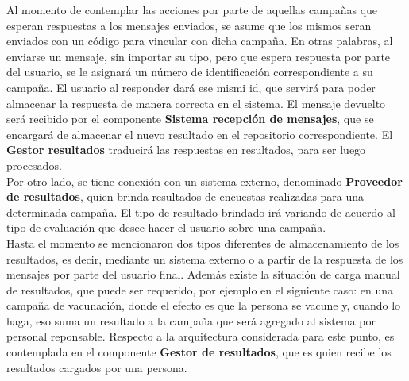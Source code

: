 \documentclass[a4paper, 11pt]{article}
\begin{document}
Al momento de contemplar las acciones por parte de aquellas campañas que esperan respuestas a los mensajes enviados, se asume que los mismos seran enviados con un código para vincular con dicha campaña. En otras palabras, al enviarse un mensaje, sin importar su tipo, pero que espera respuesta por parte del usuario, se le asignará un número de identificación correspondiente a su campaña. El usuario al responder dará ese mismi id, que servirá para poder almacenar la respuesta de manera correcta en el sistema. El mensaje devuelto será recibido por el componente \textbf{Sistema recepción de mensajes}, que se encargará de almacenar el nuevo resultado en el repositorio correspondiente. El \textbf{Gestor resultados} traducirá las respuestas en resultados, para ser luego procesados. \\

Por otro lado, se tiene conexión con un sistema externo, denominado \textbf{Proveedor de resultados}, quien brinda resultados de encuestas realizadas para una determinada campaña. El tipo de resultado brindado irá variando de acuerdo al tipo de evaluación que desee hacer el usuario sobre una campaña. \\

Hasta el momento se mencionaron dos tipos diferentes de almacenamiento de los resultados, es decir, mediante un sistema externo o a partir de la respuesta de los mensajes por parte del usuario final. 
Además existe la situación de carga manual de resultados, que puede ser requerido, por ejemplo en el siguiente caso: en una campaña de vacunación, donde el efecto es que la persona se vacune y, cuando lo haga, eso suma un resultado a la campaña que será agregado al sistema por personal reponsable. 
Respecto a la arquitectura considerada para este punto, es contemplada en el componente \textbf{Gestor de resultados}, que es quien recibe los resultados cargados por una persona.\\

\end{document}
